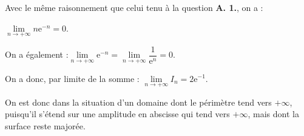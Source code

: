 \documentclass[10pt]{article}
\providecommand{\e}{{\mathrm{e}}}
\begin{document}
\begin{enumerate}
\begin{enumerate}
Avec le même raisonnement que celui tenu à la question \textbf{A. 1.}, on a :

$\lim\limits_{n\to +\infty} n\e^{-n} = 0$.

On a également :\quad $\lim\limits_{n\to +\infty} \e^{-n} = \lim\limits_{n\to +\infty} \dfrac{1}{\e^{n}} = 0$.

On a donc, par limite de la somme : \quad $\lim\limits_{n \to +\infty} I_n = 2\e^{-1}$.

On est donc dans la situation d'un domaine dont le périmètre tend vers $+\infty$, puisqu'il s'étend sur une amplitude en abscisse qui tend vers $+\infty$, mais dont la surface reste majorée.
		\end{enumerate}
	\end{enumerate}

\bigskip
\end{document}
